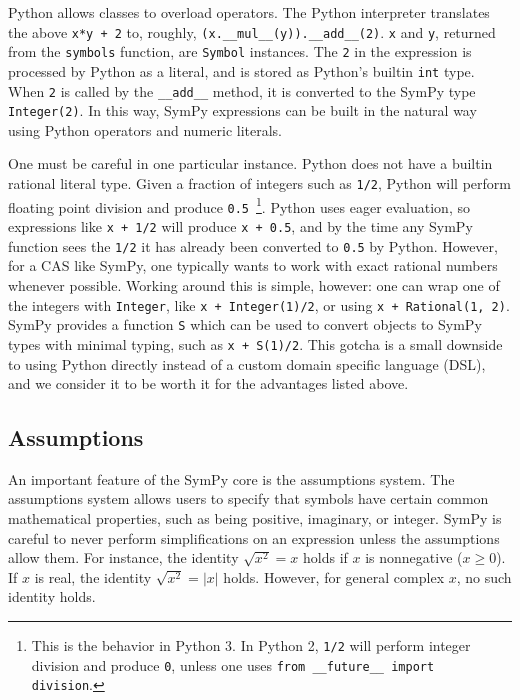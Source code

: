 Python allows classes to overload operators. The Python interpreter translates
the above \texttt{x*y + 2} to, roughly,
\verb|(x.__mul__(y)).__add__(2)|. \texttt{x} and \texttt{y}, returned from
the \texttt{symbols} function, are \texttt{Symbol} instances. The \texttt{2}
in the expression is processed by Python as a literal, and is stored as
Python's builtin \texttt{int} type. When \texttt{2} is called by the
\verb|__add__| method, it is converted to the SymPy type \verb|Integer(2)|. In
this way, SymPy expressions can be built in the natural way using Python
operators and numeric literals.

One must be careful in one particular instance. Python does not have a builtin
rational literal type. Given a fraction of integers such as \texttt{1/2},
Python will perform floating point division and produce
\texttt{0.5}~\footnote{This is the behavior in Python 3. In Python 2,
  \texttt{1/2} will perform integer division and produce \texttt{0}, unless
  one uses \texttt{from \_\_future\_\_ import division}.}. Python uses eager
evaluation, so expressions like \texttt{x + 1/2} will produce \texttt{x +
  0.5}, and by the time any SymPy function sees the \texttt{1/2} it has
already been converted to \texttt{0.5} by Python. However, for a CAS like
SymPy, one typically wants to work with exact rational numbers whenever
possible. Working around this is simple, however:  one can wrap one of the
integers with \texttt{Integer}, like \verb|x + Integer(1)/2|, or using
\verb|x + Rational(1, 2)|. SymPy provides a function \texttt{S} which can be
used to convert objects to SymPy types with minimal typing, such as \verb|x + S(1)/2|.
This gotcha is a small downside to using Python directly instead
of a custom domain specific language (DSL), and we consider it to be worth it
for the advantages listed above.

\subsection{Assumptions}

An important feature of the SymPy core is the assumptions system. The
assumptions system allows users to specify that symbols have certain common
mathematical properties, such as being positive, imaginary, or integer. SymPy
is careful to never perform simplifications on an expression unless the
assumptions allow them. For instance, the identity $\sqrt{x^2} = x$ holds if
$x$ is nonnegative ($x\ge 0$). If $x$ is real, the identity $\sqrt{x^2}=|x|$
holds. However, for general complex $x$, no such identity holds.

